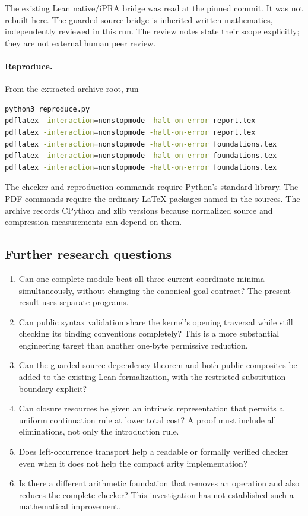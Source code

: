 \documentclass[11pt,letterpaper]{article}
\theoremstyle{definition}\newtheorem{definition}[theorem]{Definition}
\theoremstyle{remark}\newtheorem{remark}[theorem]{Remark}
\begin{document}
The existing Lean native/iPRA bridge was read at the pinned commit. It was
not rebuilt here. The guarded-source bridge is inherited written
mathematics, independently reviewed in this run. The review notes state
their scope explicitly; they are not external human peer review.

\paragraph{Reproduce.}
From the extracted archive root, run
\begin{lstlisting}[language=bash]
python3 reproduce.py
pdflatex -interaction=nonstopmode -halt-on-error report.tex
pdflatex -interaction=nonstopmode -halt-on-error report.tex
pdflatex -interaction=nonstopmode -halt-on-error foundations.tex
pdflatex -interaction=nonstopmode -halt-on-error foundations.tex
pdflatex -interaction=nonstopmode -halt-on-error foundations.tex
\end{lstlisting}
The checker and reproduction commands require Python's standard library.
The PDF commands require the ordinary LaTeX packages named in the sources.
The archive records CPython and zlib versions because normalized source
and compression measurements can depend on them.

\subsection*{Further research questions}

\begin{enumerate}
\item Can one complete module beat all three current coordinate minima
simultaneously, without changing the canonical-goal contract? The present
result uses separate programs.
\item Can public syntax validation share the kernel's opening traversal
while still checking its binding conventions completely? This is a more
substantial engineering target than another one-byte permissive reduction.
\item Can the guarded-source dependency theorem and both public composites
be added to the existing Lean formalization, with the restricted
substitution boundary explicit?
\item Can closure resources be given an intrinsic representation that
permits a uniform continuation rule at lower total cost? A proof must
include all eliminations, not only the introduction rule.
\item Does left-occurrence transport help a readable or formally verified
checker even when it does not help the compact arity implementation?
\item Is there a different arithmetic foundation that removes an operation
and also reduces the complete checker? This investigation has not
established such a mathematical improvement.
\end{enumerate}
\end{document}
